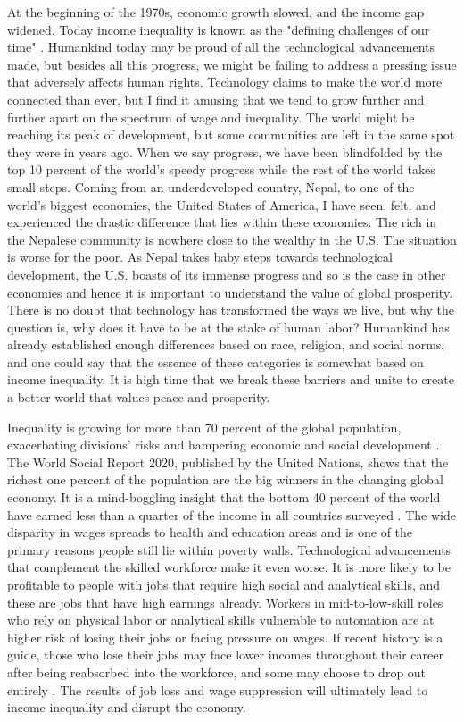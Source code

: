 At the beginning of the 1970s, economic growth slowed, and the income gap widened. Today income inequality is known as the "defining challenges of our time" \cite{nationalarchives}. Humankind today may be proud of all the technological advancements made, but besides all this progress, we might be failing to address a pressing issue that adversely affects human rights. Technology claims to make the world more connected than ever, but I find it amusing that we tend to grow further and further apart on the spectrum of wage and inequality. The world might be reaching its peak of development, but some communities are left in the same spot they were in years ago. When we say progress, we have been blindfolded by the top 10 percent of the world's speedy progress while the rest of the world takes small steps. Coming from an underdeveloped country, Nepal, to one of the world's biggest economies, the United States of America, I have seen, felt, and experienced the drastic difference that lies within these economies. The rich in the Nepalese community is nowhere close to the wealthy in the U.S. The situation is worse for the poor. As Nepal takes baby steps towards technological development, the U.S. boasts of its immense progress and so is the case in other economies and hence it is important to understand the value of global prosperity. There is no doubt that technology has transformed the ways we live, but why the question is, why does it have to be at the stake of human labor? Humankind has already established enough differences based on race, religion, and social norms, and one could say that the essence of these categories is somewhat based on income inequality. It is high time that we break these barriers and unite to create a better world that values peace and prosperity.


Inequality is growing for more than 70 percent of the global population, exacerbating divisions' risks and hampering economic and social development \cite{unitednations}. The World Social Report 2020, published by the United Nations, shows that the richest one percent of the population are the big winners in the changing global economy. It is a mind-boggling insight that the bottom 40 percent of the world have earned less than a quarter of the income in all countries surveyed \cite{unitednations}. The wide disparity in wages spreads to health and education areas and is one of the primary reasons people still lie within poverty walls. Technological advancements that complement the skilled workforce make it even worse. It is more likely to be profitable to people with jobs that require high social and analytical skills, and these are jobs that have high earnings already. Workers in mid-to-low-skill roles who rely on physical labor or analytical skills vulnerable to automation are at higher risk of losing their jobs or facing pressure on wages. If recent history is a guide, those who lose their jobs may face lower incomes throughout their career after being reabsorbed into the workforce, and some may choose to drop out entirely \cite{harris_kimson_schwedel_2019}. The results of job loss and wage suppression will ultimately lead to income inequality and disrupt the economy.


